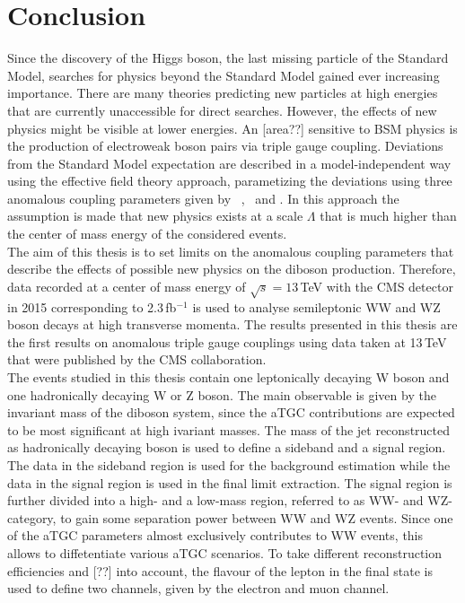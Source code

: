 \chapter{Conclusion}
\label{ch:Conclusion}
Since the discovery of the Higgs boson, the last missing particle of the Standard Model, searches for physics beyond the Standard Model gained ever increasing importance. There are many theories predicting new particles at high energies that are currently unaccessible for direct searches. However, the effects of new physics might be visible at lower energies. An [area??] sensitive to BSM physics is the production of electroweak boson pairs via triple gauge coupling. Deviations from the Standard Model expectation are described in a model-independent way using the effective field theory approach, parametizing the deviations using three anomalous coupling parameters given by \Tcwww \ , \Tccw \ and \Tcb . In this approach the assumption is made that new physics exists at a scale $\Lambda$ that is much higher than the center of mass energy of the considered events.\\

The aim of this thesis is to set limits on the anomalous coupling parameters that describe the effects of possible new physics on the diboson production. Therefore, data recorded at a center of mass energy of $\sqrt{s}=13$\,TeV with the CMS detector in 2015 corresponding to 2.3\,fb$^{-1}$ is used to analyse semileptonic WW and WZ boson decays at high transverse momenta. The results presented in this thesis are the first results on anomalous triple gauge couplings using data taken at 13\,TeV that were published by the CMS collaboration.\\

The events studied in this thesis contain one leptonically decaying W boson and one hadronically decaying W or Z boson. The main observable is given by the invariant mass of the diboson system, since the aTGC contributions are expected to be most significant at high ivariant masses. The mass of the jet reconstructed as hadronically decaying boson is used to define a sideband and a signal region. The data in the sideband region is used for the background estimation while the data in the signal region is used in the final limit extraction. The signal region is further divided into a high- and a low-mass region, referred to as WW- and WZ-category, to gain some separation power between WW and WZ events. Since one of the aTGC parameters almost exclusively contributes to WW events, this allows to diffetentiate various aTGC scenarios. To take different reconstruction efficiencies and [??] into account, the flavour of the lepton in the final state is used to define two channels, given by the electron and muon channel.\\

